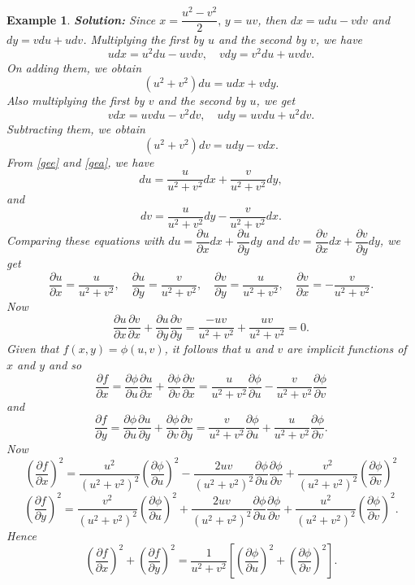 \documentclass[titlepage,a4paper,12pt]{report}
\newtheorem{example}{Example}[section]
\begin{document}
\begin{example}
\noindent \textbf{Solution:} Since $x=\dfrac{u^2-v^2}{2}, \, y=uv$, then $dx=udu-vdv$ and $dy=vdu+udv$. Multiplying the first by $u$ and the second by $v$, we have 
\[udx=u^2du-uvdv, \quad vdy=v^2du+uvdv.\]
On adding them, we obtain 
\begin{equation}\label{gee}
(u^2+v^2)du =udx+vdy.
\end{equation}
Also multiplying the first by $v$ and the second by $u$, we get 
\[vdx=uvdu-v^2dv, \quad udy=uvdu+u^2dv.\]
Subtracting them, we obtain 
\begin{equation}\label{gea}
(u^2+v^2)dv=udy-vdx.
\end{equation}
From \eqref{gee} and \eqref{gea}, we have 
\[du=\dfrac{u}{u^2+v^2}dx+\dfrac{v}{u^2+v^2}dy,\] and 
\[dv=\dfrac{u}{u^2+v^2}dy-\dfrac{v}{u^2+v^2}dx.\]
Comparing these equations with $du=\dfrac{\partial u}{\partial x}dx+\dfrac{\partial u}{\partial y}dy$ and $dv=\dfrac{\partial v}{\partial x}dx+\dfrac{\partial v}{\partial y}dy$, we get 
\[\dfrac{\partial u}{\partial x}=\dfrac{u}{u^2+v^2}, \quad \dfrac{\partial u}{\partial y}=\dfrac{v}{u^2+v^2}, \quad \dfrac{\partial v}{\partial y}=\dfrac{u}{u^2+v^2}, \quad \dfrac{\partial v}{\partial x}=-\dfrac{v}{u^2+v^2}.\]
Now 
\[\dfrac{\partial u}{\partial x}\dfrac{\partial v}{\partial x}+\dfrac{\partial u}{\partial y}\dfrac{\partial v}{\partial y} =\dfrac{-uv}{u^2+v^2}+\dfrac{uv}{u^2+v^2}=0.\]
Given that $f(x,y)=\phi (u,v)$, it follows that $u$ and $v$ are implicit functions of $x$ and $y$ and so 
\[\dfrac{\partial f}{\partial x}=\dfrac{\partial \phi}{\partial u}\dfrac{\partial u}{\partial x}+\dfrac{\partial \phi}{\partial v}\dfrac{\partial v}{\partial x}=\dfrac{u}{u^2+v^2}\dfrac{\partial \phi}{\partial u}-\dfrac{v}{u^2+v^2}\dfrac{\partial \phi}{\partial v}\] and 
 \[\dfrac{\partial f}{\partial y}=\dfrac{\partial \phi}{\partial u}\dfrac{\partial u}{\partial y}+\dfrac{\partial \phi}{\partial v}\dfrac{\partial v}{\partial y}=\dfrac{v}{u^2+v^2}\dfrac{\partial \phi}{\partial u}+\dfrac{u}{u^2+v^2}\dfrac{\partial \phi}{\partial v}.\]
 Now 
 \[\left(\dfrac{\partial f}{\partial x}\right)^2=\dfrac{u^2}{(u^2+v^2)^2}\left(\dfrac{\partial \phi}{\partial u}\right)^2-\dfrac{2uv}{(u^2+v^2)^2}\dfrac{\partial \phi}{\partial u}\dfrac{\partial \phi}{\partial v}+\dfrac{v^2}{(u^2+v^2)^2}\left(\dfrac{\partial \phi}{\partial v}\right)^2\]
 \[\left(\dfrac{\partial f}{\partial y}\right)^2=\dfrac{v^2}{(u^2+v^2)^2}\left(\dfrac{\partial \phi}{\partial u}\right)^2+\dfrac{2uv}{(u^2+v^2)^2}\dfrac{\partial \phi}{\partial u}\dfrac{\partial \phi}{\partial v}+\dfrac{u^2}{(u^2+v^2)^2}\left(\dfrac{\partial \phi}{\partial v}\right)^2.\]
 Hence
\[\left(\dfrac{\partial f}{\partial x}\right)^2 +\left(\dfrac{\partial f}{\partial y}\right)^2=\dfrac{1}{u^2+v^2}\left[\left(\dfrac{\partial \phi}{\partial u}\right)^2+\left(\dfrac{\partial \phi}{\partial v}\right)^2\right].\] 
\end{example}
\end{document}
